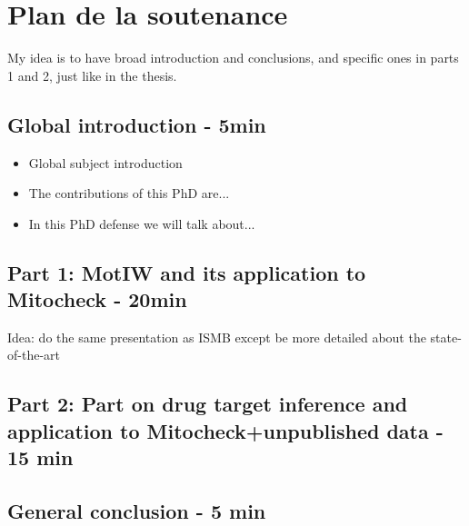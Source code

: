 \documentclass[12pt]{article}
\begin{document}
\section{Plan de la soutenance}
My idea is to have broad introduction and conclusions, and specific ones in parts 1 and 2, just like in the thesis.
\subsection*{Global introduction - 5min}
\begin{itemize}
\item Global subject introduction
\item The contributions of this PhD are... 
\item In this PhD defense we will talk about...
\end{itemize}
\subsection*{Part 1: MotIW and its application to Mitocheck - 20min}
Idea: do the same presentation as ISMB except be more detailed about the state-of-the-art
\subsection*{Part 2: Part on drug target inference and application to Mitocheck+unpublished data - 15 min}
\subsection*{General conclusion - 5 min}

%
%
\end{document}
